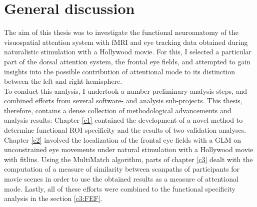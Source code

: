 \documentclass[a4paper, 12pt]{scrreprt}
\begin{document}
\chapter{General discussion}\label{section:discussion}
The aim of this thesis was to investigate the functional neuroanatomy of the visuospatial attention system with fMRI and eye tracking data obtained during naturalistic stimulation with a Hollywood movie. For this, I selected a particular part of the dorsal attention system, the frontal eye fields, and attempted to gain insights into the possible contribution of attentional mode to its distinction between the left and right hemisphere. \\
To conduct this analysis, I undertook a number preliminary analysis steps, and combined efforts from several software- and analysis sub-projects. This thesis, therefore, contains a dense collection of methodological advancements and analysis results: Chapter \ref{c1} contained the development of a novel method to determine functional ROI specificity and the results of two validation analyses. Chapter \ref{c2} involved the localization of the frontal eye fields with a GLM on unconstrained eye movements under natural stimulation with a Hollywood movie with fitlins. Using the MultiMatch algorithm, parts of chapter \ref{c3} dealt with the computation of a measure of similarity between scanpaths of participants for movie scenes in order to use the obtained results as a measure of attentional mode. Lastly, all of these efforts were combined to the functional specificity analysis in the section \ref{c3:FEF}. \\
\end{document}
